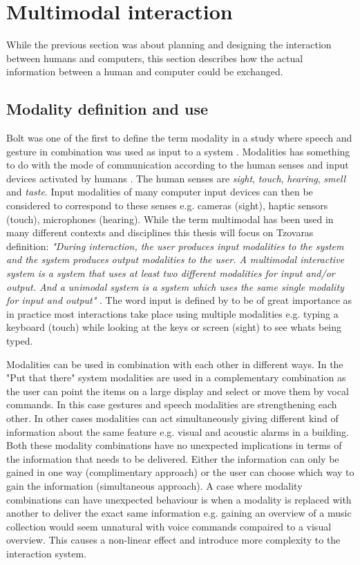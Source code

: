 \section{Multimodal interaction}
While the previous section was about planning and designing the interaction between humans and computers, this section describes how the actual information between a human and computer could be exchanged. 

\subsection{Modality definition and use}
Bolt was one of the first to define the term modality in a study where speech and gesture in combination was used as input to a system \cite{bolt_put-that-there:_1980}. Modalities has something to do with the mode of communication according to the human senses and input devices activated by humans \cite{jaimes_multimodal_2007,tzovaras_dimitrios_multimodal_2008}. The human senses are \textit{sight}, \textit{touch}, \textit{hearing}, \textit{smell} and \textit{taste}. Input modalities of many computer input devices can then be considered to correspond to these senses e.g. cameras (sight), haptic sensors (touch), microphones (hearing). While the term multimodal has been used in many different contexts and disciplines this thesis will focus on Tzovaras definition: \textit{"During interaction, the user produces input modalities to the system and the system produces output modalities to the user. A multimodal interactive system is a system that uses at least two different modalities for input and/or output. And a unimodal system is a system which uses the same single modality for input and output"} \cite{tzovaras_dimitrios_multimodal_2008}. The word input is defined by \cite{jaimes_multimodal_2007} to be of great importance as in practice most interactions take place using multiple modalities e.g. typing a keyboard (touch) while looking at the keys or screen (sight) to see whats being typed.

Modalities can be used in combination with each other in different ways. In the "Put that there" system \cite{bolt_put-that-there:_1980} modalities are used in a complementary combination as the user can point the items on a large display and select or move them by vocal commands. In this case gestures and speech modalities are strengthening each other. In other cases modalities can act simultaneously giving different kind of information about the same feature e.g. visual and acoustic alarms in a building. Both these modality combinations have no unexpected implications in terms of the information that needs to be delivered. Either the information can only be gained in one way (complimentary approach) or the user can choose which way to gain the information (simultaneous approach). A case where modality combinations can have unexpected behaviour is when a modality is replaced with another to deliver the exact same information e.g. gaining an overview of a music collection would seem unnatural with voice commands compaired to a visual overview. This causes a non-linear effect and introduce more complexity to the interaction system.

